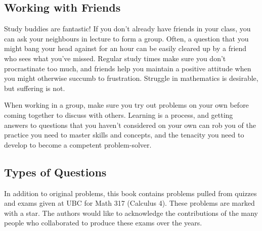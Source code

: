 \subsection*{Working with Friends}

Study buddies are fantastic! If you don't already have friends in your class, you can ask your neighbours in lecture to form a group. Often, a question that you might bang your head against for an hour can be easily cleared up by a friend who sees what you've missed. Regular study times make sure you don't procrastinate too much, and friends help you maintain a positive attitude when you might otherwise succumb to frustration. Struggle in mathematics is desirable, but suffering is not.

When working in a group, make sure you try out problems on your own before coming together to discuss with others. Learning is a process, and getting answers to questions that you haven't considered on your own can rob you of the practice you need to master skills and concepts, and the tenacity you need to develop to become a competent problem-solver.

\subsection*{Types of Questions}
%

\begin{question}[year]
In addition to original problems, this book contains problems pulled from quizzes and exams given at UBC for Math 317 (Calculus 4). These problems are marked with a star. The authors would like to acknowledge the contributions of the many people who collaborated to produce these exams over the years.
\end{question}


